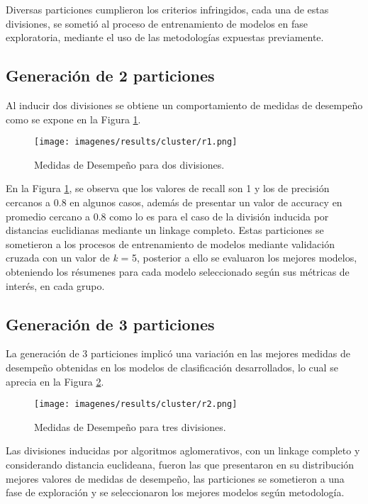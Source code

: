 Diversas particiones cumplieron los criterios infringidos, cada una de estas divisiones, se someti\'o al proceso de entrenamiento de modelos en fase exploratoria, mediante el uso de las metodolog\'ias expuestas previamente. 

\subsection{Generaci\'on de 2 particiones}

Al inducir dos divisiones se obtiene un comportamiento de medidas de desempe\~no como se expone en la Figura \ref{cluster1}.

\begin{figure}[!h]
	\centering
	\texttt{[image: imagenes/results/cluster/r1.png]}
	\caption{Medidas de Desempe\~no para dos divisiones.}
	\label{cluster1}
\end{figure}

En la Figura \ref{cluster1}, se observa que los valores de recall son 1 y los de precisi\'on cercanos a 0.8 en algunos casos, adem\'as de presentar un valor de accuracy en promedio cercano a 0.8 como lo es para el caso de la divisi\'on inducida por distancias euclidianas mediante un linkage completo. Estas particiones se sometieron a los procesos de entrenamiento de modelos mediante validaci\'on cruzada con un valor de \textit{k} = 5, posterior a ello se evaluaron los mejores modelos, obteniendo los r\'esumenes para cada modelo seleccionado seg\'un sus m\'etricas de inter\'es, en cada grupo.

\subsection{Generaci\'on de 3 particiones}

La generaci\'on de 3 particiones implic\'o una variaci\'on en las mejores medidas de desempe\~no obtenidas en los modelos de clasificaci\'on desarrollados, lo cual se aprecia en la Figura \ref{cluster2}. 

\begin{figure}[!h]
	\centering
	\texttt{[image: imagenes/results/cluster/r2.png]}
	\caption{Medidas de Desempe\~no para tres divisiones.}
	\label{cluster2}
\end{figure}

Las divisiones inducidas por algoritmos aglomerativos, con un linkage completo y considerando distancia euclideana, fueron las que presentaron en su distribuci\'on mejores valores de medidas de desempe\~no, las particiones se sometieron a una fase de exploraci\'on y se seleccionaron los mejores modelos seg\'un metodolog\'ia.

